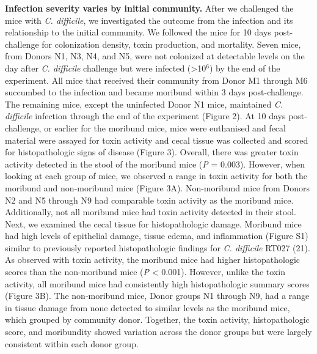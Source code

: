 \documentclass[
  12pt,
]{article}
\begin{document}
\textbf{Infection severity varies by initial community.} After we
challenged the mice with \emph{C. difficile}, we investigated the
outcome from the infection and its relationship to the initial
community. We followed the mice for 10 days post-challenge for
colonization density, toxin production, and mortality. Seven mice, from
Donors N1, N3, N4, and N5, were not colonized at detectable levels on
the day after \emph{C. difficile} challenge but were infected
(\textgreater10\(^{6}\)) by the end of the experiment. All mice that
received their community from Donor M1 through M6 succumbed to the
infection and became moribund within 3 days post-challenge. The
remaining mice, except the uninfected Donor N1 mice, maintained \emph{C.
difficile} infection through the end of the experiment (Figure 2). At 10
days post-challenge, or earlier for the moribund mice, mice were
euthanised and fecal material were assayed for toxin activity and cecal
tissue was collected and scored for histopathologic signs of disease
(Figure 3). Overall, there was greater toxin activity detected in the
stool of the moribund mice (\emph{P} = 0.003). However, when looking at
each group of mice, we observed a range in toxin activity for both the
moribund and non-moribund mice (Figure 3A). Non-moribund mice from
Donors N2 and N5 through N9 had comparable toxin activity as the
moribund mice. Additionally, not all moribund mice had toxin activity
detected in their stool. Next, we examined the cecal tissue for
histopathologic damage. Moribund mice had high levels of epithelial
damage, tissue edema, and inflammation (Figure S1) similar to previously
reported histopathologic findings for \emph{C. difficile} RT027 (21). As
observed with toxin activity, the moribund mice had higher
histopathologic scores than the non-moribund mice (\emph{P} \textless{}
0.001). However, unlike the toxin activity, all moribund mice had
consistently high histopathologic summary scores (Figure 3B). The
non-moribund mice, Donor groups N1 through N9, had a range in tissue
damage from none detected to similar levels as the moribund mice, which
grouped by community donor. Together, the toxin activity,
histopathologic score, and moribundity showed variation across the donor
groups but were largely consistent within each donor group.
\end{document}

